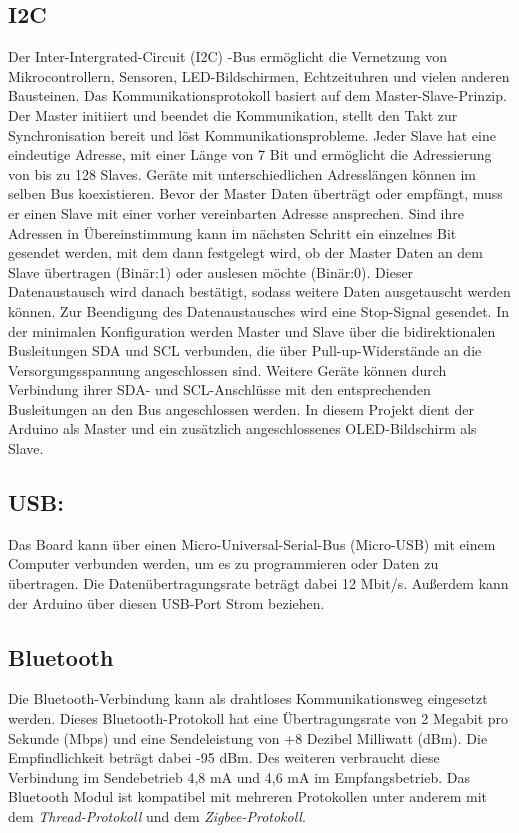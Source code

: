 \subsection{I2C}
Der Inter-Intergrated-Circuit (I2C) -Bus ermöglicht die Vernetzung von Mikrocontrollern, Sensoren, LED-Bildschirmen, Echtzeituhren und vielen anderen Bausteinen. Das Kommunikationsprotokoll basiert auf dem Master-Slave-Prinzip. Der Master initiiert und beendet die Kommunikation, stellt den Takt zur Synchronisation bereit und löst Kommunikationsprobleme. Jeder Slave hat eine eindeutige Adresse, mit einer Länge von 7 Bit und ermöglicht die Adressierung von bis zu 128 Slaves. Geräte mit unterschiedlichen Adresslängen können im selben Bus koexistieren. Bevor der Master Daten überträgt oder empfängt, muss er einen Slave mit einer vorher vereinbarten Adresse ansprechen.\cite{Meroth.2018}\cite{STM1.2015} Sind ihre Adressen in Übereinstimmung kann im nächsten Schritt ein einzelnes Bit gesendet werden, mit dem dann festgelegt wird, ob der Master Daten an dem Slave übertragen (Binär:1) oder auslesen möchte (Binär:0). Dieser Datenaustausch wird danach bestätigt, sodass weitere Daten ausgetauscht werden können. Zur Beendigung des Datenaustausches wird eine Stop-Signal gesendet.\cite{Gehrke.2022} In der minimalen Konfiguration werden Master und Slave über die bidirektionalen Busleitungen SDA und SCL verbunden, die über Pull-up-Widerstände an die Versorgungsspannung angeschlossen sind. Weitere Geräte können durch Verbindung ihrer SDA- und SCL-Anschlüsse mit den entsprechenden Busleitungen an den Bus angeschlossen werden.\cite{Meroth.2018} In diesem Projekt dient der Arduino als Master und ein zusätzlich angeschlossenes OLED-Bildschirm als Slave.

\subsection{USB:}
Das Board kann über einen Micro-Universal-Serial-Bus (Micro-USB) mit einem Computer verbunden werden, um es zu programmieren oder Daten zu übertragen. Die Datenübertragungsrate beträgt dabei 12 Mbit/s. Außerdem kann der Arduino über diesen USB-Port Strom beziehen.

\subsection{Bluetooth}
Die Bluetooth-Verbindung kann als drahtloses Kommunikationsweg eingesetzt werden. Dieses Bluetooth-Protokoll hat eine Übertragungsrate von 2 Megabit pro Sekunde (Mbps) und eine Sendeleistung von +8 Dezibel Milliwatt (dBm). Die Empfindlichkeit beträgt dabei -95 dBm. Des weiteren verbraucht diese Verbindung im Sendebetrieb 4,8 mA und 4,6 mA im Empfangsbetrieb. Das Bluetooth Modul ist kompatibel mit mehreren Protokollen unter anderem mit dem \textit{Thread-Protokoll} und dem \textit{Zigbee-Protokoll}.\cite{Ard.2024}\cite{NrdSem3.2024}

